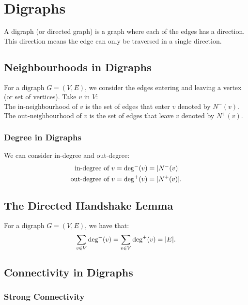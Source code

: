 \section{Digraphs}

A digraph (or directed graph) is a graph where each of the edges
has a direction. This direction means the edge can only be traversed
in a single direction.

\subsection{Neighbourhoods in Digraphs}

For a digraph $G = (V, E)$, we consider the edges entering and 
leaving a vertex (or set of vertices). Take $v$ in $V$:
\\[\baselineskip]
The in-neighbourhood of $v$ is the set of edges that enter $v$
denoted by $N^-(v)$.
\\[\baselineskip]
The out-neighbourhood of $v$ is the set of edges that leave $v$
denoted by $N^+(v)$.

\subsubsection{Degree in Digraphs}

We can consider in-degree and out-degree: \begin{align*}
    \text{in-degree of } v  &= \operatorname{deg}^-(v) = |N^-(v)| \\ 
    \text{out-degree of } v &= \operatorname{deg}^+(v) = |N^+(v)|. 
\end{align*}

\subsection{The Directed Handshake Lemma}

For a digraph $G = (V, E)$, we have that: \begin{gather*}
  \sum_{v \in V} \operatorname{deg}^-(v) = \sum_{v \in V} \operatorname{deg}^+(v) = |E|.
\end{gather*}

\subsection{Connectivity in Digraphs}

\subsubsection{Strong Connectivity}


